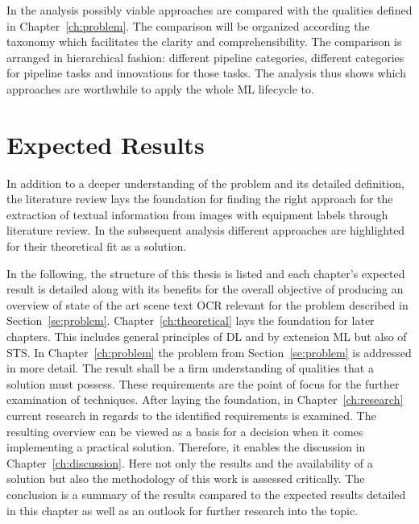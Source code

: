 In the analysis possibly viable approaches are compared with the qualities defined
in Chapter~\ref{ch:problem}.
The comparison will be organized according the taxonomy which facilitates the clarity and
comprehensibility.
The comparison is arranged in hierarchical fashion: different pipeline categories,
different categories for pipeline tasks and innovations for those tasks.
The analysis thus shows which approaches are worthwhile to apply the whole \ac{ML} lifecycle to.

\section{Expected Results}
In addition to a deeper understanding of the problem and its detailed definition, the literature
review lays the foundation for finding the right approach for the extraction of textual
information from images with equipment labels through literature review.
In the subsequent analysis different approaches are highlighted for their theoretical fit as a solution.

In the following, the structure of this thesis is listed and each chapter's expected
result is detailed along with its benefits for the overall objective of producing an overview of
state of the art scene text \ac{OCR} relevant for the problem described in Section~\ref{se:problem}.
Chapter~\ref{ch:theoretical} lays the foundation for later chapters.
This includes general principles of \ac{DL} and by extension \ac{ML} but also of \ac{STS}.
In Chapter~\ref{ch:problem} the problem from Section~\ref{se:problem} is addressed in more detail.
The result shall be a firm understanding of qualities that a solution must possess.
These requirements are the point of focus for the further examination of techniques.
After laying the foundation, in Chapter~\ref{ch:research} current research in regards to the
identified requirements is examined.
The resulting overview can be viewed as a basis for a decision when it comes implementing a practical
solution.
Therefore, it enables the discussion in Chapter~\ref{ch:discussion}.
Here not only the results and the availability of a solution but also the methodology of this work
is assessed critically.
The conclusion is a summary of the results compared to the expected results detailed in this chapter
as well as an outlook for further research into the topic.
